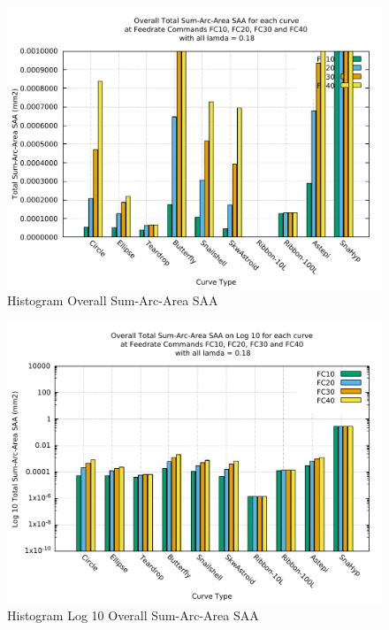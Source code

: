 \clearpage
\pagebreak
\begin{landscape}
	
\begin{figure}
\centering
\caption  {Histogram Overall Sum-Arc-Area SAA}
\label{img-Histogram Overall Sum-Arc-Area SAA}
\includegraphics[width=1.30\textwidth]{Chap4/Overall/Histogram/SAA-img-Histo-Overall-Total-Sum-Arc-Area.pdf} 
\end{figure}
	
\end{landscape}

\clearpage
\pagebreak
\begin{landscape}
	
\begin{figure}
\centering
\caption  {Histogram Log 10 Overall Sum-Arc-Area SAA}
\label{img-Histogram Log 10 Overall Sum-Arc-Area SAA}
\includegraphics[width=1.30\textwidth]{Chap4/Overall/Histogram/SAA-img-Histo-Log10-Overall-Total-Sum-Arc-Area.pdf} 
\end{figure}
	
\end{landscape}

